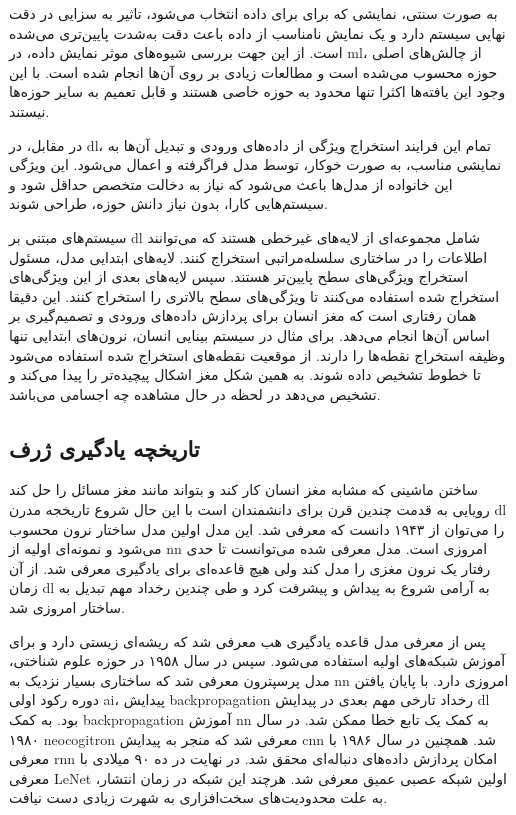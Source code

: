 به صورت سنتی، نمایشی که برای برای داده انتخاب می‌شود، تاثیر به سزایی در دقت
نهایی سیستم دارد و یک نمایش نامناسب از داده باعث دقت به‌شدت پایین‌تری می‌شده
است. از این جهت بررسی شیوه‌های موثر نمایش داده، در \gls{ml}، از چالش‌های اصلی
حوزه محسوب می‌شده است و مطالعات زیادی بر روی آن‌ها انجام شده است. با این وجود
این یافته‌ها اکثرا تنها محدود به حوزه خاصی هستند و قابل تعمیم به سایر حوزه‌ها
نیستند.

در مقابل، در \gls{dl}، تمام این فرایند استخراج ویژگی از داده‌های ورودی و تبدیل
آن‌ها به نمایشی مناسب، به صورت خوکار، توسط مدل فراگرفته و اعمال می‌شود. این
ویژگی این خانواده از مدل‌ها باعث می‌شود که نیاز به دخالت متخصص حداقل شود و
سیستم‌هایی کارا، بدون نیاز دانش حوزه، طراحی شوند.

سیستم‌های مبتنی بر \gls{dl} شامل مجموعه‌ای از لایه‌های غیرخطی هستند که می‌توانند
اطلاعات را در ساختاری سلسله‌مراتبی استخراج کنند. لایه‌های ابتدایی مدل، مسئول
استخراج ویژگی‌های سطح پایین‌تر هستند. سپس لایه‌های بعدی از این ویژگی‌های استخراج
شده استفاده می‌کنند تا ویژگی‌های سطح بالاتری را استخراج کنند. این دقیقا همان
رفتاری است که مغز انسان برای پردازش داده‌های ورودی و تصمیم‌گیری بر اساس آن‌ها
انجام می‌دهد. برای مثال در سیستم بینایی انسان، نرون‌های ابتدایی تنها وظیفه
استخراج نقطه‌ها را دارند. از موقعیت نقطه‌های استخراج شده استفاده می‌شود تا خطوط
تشخیص داده شوند. به همین شکل مغز اشکال پیچیده‌تر را پیدا می‌کند و تشخیص می‌دهد
در لحظه در حال مشاهده چه اجسامی می‌باشد.

\subsection{تاریخچه یادگیری ژرف}
ساختن ماشینی که مشابه مغز انسان کار کند و بتواند مانند مغز مسائل را حل کند
رویایی به قدمت چندین قرن برای دانشمندان است با این حال شروع تاریخجه مدرن
\gls{dl} را می‌توان از ۱۹۴۳ دانست که  معرفی شد. این مدل
اولین مدل ساختار نرون محسوب می‌شود و نمونه‌ای اولیه از \gls{nn} امروزی است. مدل
معرفی شده می‌توانست تا حدی رفتار یک نرون مغزی را مدل کند ولی هیچ قاعده‌ای برای
یادگیری معرفی شد. از آن زمان \gls{dl} به آرامی شروع به پیداش و پیشرفت کرد و طی
چندین رخداد مهم تبدیل به ساختار امروزی شد.

پس از معرفی مدل  قاعده یادگیری هب معرفی شد که ریشه‌ای زیستی
دارد و برای آموزش شبکه‌های اولیه استفاده می‌شود. سپس در سال ۱۹۵۸ در حوزه علوم
شناختی، مدل پرسپترون معرفی شد که ساختاری بسیار نزدیک به \gls{nn} امروزی دارد. با
پایان یافتن دوره رکود اولی \gls{ai}، پیدایش \gls{backpropagation} رخداد تارخی
مهم بعدی در پیدایش \gls{dl} بود. به کمک \gls{backpropagation} آموزش \gls{nn} به
کمک یک تابع خطا ممکن شد. در سال ۱۹۸۰ neocogitron معرفی شد که منجر به پیدایش
\gls{cnn} شد. همچنین در سال ۱۹۸۶ با معرفی \gls{rnn} امکان پردازش داده‌های
دنباله‌ای محقق شد. در نهایت در ده ۹۰ میلادی با معرفی LeNet اولین شبکه عصبی عمیق
معرفی شد. هرچند این شبکه در زمان انتشار، به علت محدودیت‌های سخت‌افزاری به شهرت
زیادی دست نیافت.

